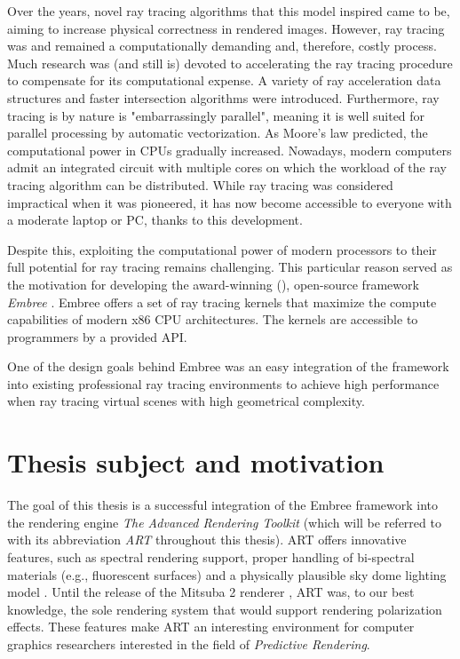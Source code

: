 Over the years, novel ray tracing algorithms that this model inspired came to be, aiming to increase physical correctness in rendered images. However, ray tracing was and remained a computationally demanding and, therefore, costly process. Much research was (and still is) devoted to accelerating the ray tracing procedure to compensate for its computational expense. A variety of ray acceleration data structures and faster intersection algorithms were introduced. Furthermore, ray tracing is by nature is "embarrassingly parallel", meaning it is well suited for parallel processing by automatic vectorization. As Moore’s law predicted, the computational power in CPUs gradually increased. Nowadays, modern computers admit an integrated circuit with multiple cores on which the workload of the ray tracing algorithm can be distributed. While ray tracing was considered impractical when it was pioneered, it has now become accessible to everyone with a moderate laptop or PC, thanks to this development.

Despite this, exploiting the computational power of modern processors to their full potential for ray tracing remains challenging. This particular reason served as the motivation for developing the award-winning (\cite{embreeAward}), open-source framework \emph{Embree} \cite{wald2014embree}. Embree offers a set of ray tracing kernels that maximize the compute capabilities of modern x86 CPU architectures. The kernels are accessible to programmers by a provided API. 

One of the design goals behind Embree was an easy integration of the framework into existing professional ray tracing environments to achieve high performance when ray tracing virtual scenes with high geometrical complexity.


\section*{Thesis subject and motivation}
The goal of this thesis is a successful integration of the Embree framework into the rendering engine \emph{The Advanced Rendering Toolkit} \cite{artSoftware} (which will be referred to with its abbreviation \emph{ART} throughout this thesis). ART offers innovative features, such as spectral rendering support, proper handling of bi-spectral materials (e.g., fluorescent surfaces) \cite{mojzik2018handling} and a physically plausible sky dome lighting model \cite{wilkie2013predicting}. Until the release of the Mitsuba 2 renderer \cite{nimier2019mitsuba}, ART was, to our best knowledge, the sole rendering system that would support rendering polarization effects. These features make ART an interesting environment for computer graphics researchers interested in the field of \emph{Predictive Rendering}. 

